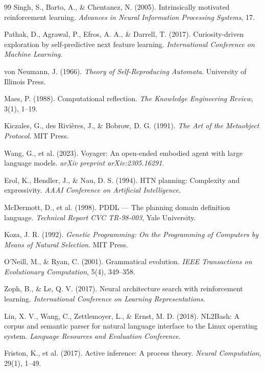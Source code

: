 \documentclass[12pt,a4paper]{report}
\begin{document}
\begin{thebibliography}{99}
Singh, S., Barto, A., \& Chentanez, N. (2005).
Intrinsically motivated reinforcement learning.
\textit{Advances in Neural Information Processing Systems}, 17.

Pathak, D., Agrawal, P., Efros, A. A., \& Darrell, T. (2017).
Curiosity-driven exploration by self-predictive next feature learning.
\textit{International Conference on Machine Learning}.

von Neumann, J. (1966).
\textit{Theory of Self-Reproducing Automata}.
University of Illinois Press.

Maes, P. (1988).
Computational reflection.
\textit{The Knowledge Engineering Review}, 3(1), 1--19.

Kiczales, G., des Rivi\`{e}res, J., \& Bobrow, D. G. (1991).
\textit{The Art of the Metaobject Protocol}.
MIT Press.

Wang, G., et al. (2023).
Voyager: An open-ended embodied agent with large language models.
\textit{arXiv preprint arXiv:2305.16291}.

Erol, K., Hendler, J., \& Nau, D. S. (1994).
HTN planning: Complexity and expressivity.
\textit{AAAI Conference on Artificial Intelligence}.

McDermott, D., et al. (1998).
PDDL --- The planning domain definition language.
\textit{Technical Report CVC TR-98-003}, Yale University.

Koza, J. R. (1992).
\textit{Genetic Programming: On the Programming of Computers by Means of Natural Selection}.
MIT Press.

O'Neill, M., \& Ryan, C. (2001).
Grammatical evolution.
\textit{IEEE Transactions on Evolutionary Computation}, 5(4), 349--358.

Zoph, B., \& Le, Q. V. (2017).
Neural architecture search with reinforcement learning.
\textit{International Conference on Learning Representations}.

Lin, X. V., Wang, C., Zettlemoyer, L., \& Ernst, M. D. (2018).
NL2Bash: A corpus and semantic parser for natural language interface to the Linux operating system.
\textit{Language Resources and Evaluation Conference}.

Friston, K., et al. (2017).
Active inference: A process theory.
\textit{Neural Computation}, 29(1), 1--49.


\end{thebibliography}
\end{document}
